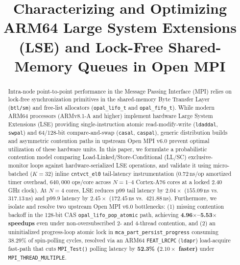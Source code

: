 \documentclass[conference]{IEEEtran}
\begin{document}
\title{Characterizing and Optimizing ARM64 Large System Extensions (LSE) and Lock-Free Shared-Memory Queues in Open MPI}

\author{
}

\maketitle

\begin{abstract}
Intra-node point-to-point performance in the Message Passing Interface (MPI) relies on lock-free synchronization primitives in the shared-memory Byte Transfer Layer (\texttt{btl/sm}) and free-list allocators (\texttt{opal\_lifo\_t} and \texttt{opal\_fifo\_t}). While modern ARM64 processors (ARMv8.1-A and higher) implement hardware Large System Extensions (LSE) providing single-instruction atomic read-modify-write (\texttt{ldaddal}, \texttt{swpal}) and 64/128-bit compare-and-swap (\texttt{casal}, \texttt{caspal}), generic distribution builds and asymmetric contention paths in upstream Open MPI v6.0 prevent optimal utilization of these hardware units. In this paper, we formulate a probabilistic contention model comparing Load-Linked/Store-Conditional (LL/SC) exclusive-monitor loops against hardware-serialized LSE operations, and validate it using micro-batched ($K=32$) inline \texttt{cntvct\_el0} tail-latency instrumentation ($0.72$\,ns/op amortized timer overhead, $640{,}000$ ops/core across $N=1\text{--}4$ Cortex-A76 cores at a locked 2.40\,GHz clock). At $N=4$ cores, LSE reduces p99 tail latency by $2.04\times$ ($155.09$\,ns vs.\ $317.13$\,ns) and p99.9 latency by $2.45\times$ ($172.45$\,ns vs.\ $421.88$\,ns). Furthermore, we isolate and resolve two upstream Open MPI v6.0 bottlenecks: (1) missing contention backoff in the 128-bit CAS \texttt{opal\_lifo\_pop\_atomic} path, achieving \textbf{4.96$\times$--5.53$\times$ speedups} even under non-oversubscribed 2- and 4-thread contention, and (2) an uninitialized progress-loop atomic lock in \texttt{mca\_part\_persist\_progress} consuming 38.29\% of spin-polling cycles, resolved via an ARM64 \texttt{FEAT\_LRCPC} (\texttt{ldapr}) load-acquire fast-path that cuts \texttt{MPI\_Test()} polling latency by \textbf{52.3\% ($2.10\times$ faster)} under \texttt{MPI\_THREAD\_MULTIPLE}.
\end{abstract}
\end{document}
